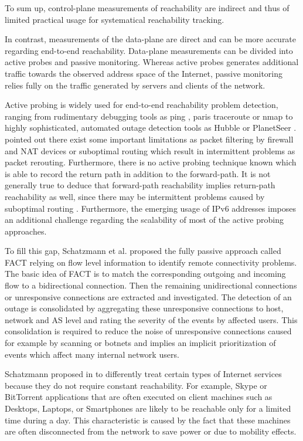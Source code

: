 \documentclass{sigcomm-alternate}
\begin{document}
To sum up, control-plane measurements of reachability are indirect
and thus of limited practical usage for systematical reachability
tracking.

In contrast, measurements of the data-plane are direct and can be
more accurate regarding end-to-end reachability. Data-plane
measurements can be divided into active probes and passive monitoring.
Whereas active probes generates additional traffic towards the
observed address space of the Internet, passive monitoring relies
fully on the traffic generated by servers and clients of the network.

Active probing is widely used for end-to-end reachability problem
detection, ranging from rudimentary debugging tools as ping
\cite{PING}, paris traceroute \cite{traceroute} or nmap \cite{Nmap}
to highly sophisticated, automated outage detection tools as Hubble
\cite{Katz:2008} or PlanetSeer \cite{Zhang:2004}. \cite{Bush:Optometry}
pointed out there exist some important limitations as packet filtering
by firewall and NAT devices or suboptimal routing which result in
intermittent problems as packet rerouting. Furthermore, there is
no active probing technique known which is able to record the return
path in addition to the forward-path. It is not generally true to
deduce that forward-path reachability implies return-path reachability
as well, since there may be intermittent problems caused by suboptimal
routing \cite{Bush:Optometry}. Furthermore, the emerging usage of IPv6
addresses imposes an additional challenge regarding the scalability of
most of the active probing approaches.

To fill this gap, Schatzmann et al. proposed the fully
passive approach called FACT\cite{SchatzmannPAM2011} relying on flow level information to
identify remote connectivity problems. The basic idea of FACT is to
match the corresponding outgoing and incoming flow to a bidirectional
connection. Then the remaining unidirectional connections or unresponsive
connections are extracted and investigated. The detection of an outage
is consolidated by aggregating these unresponsive connections to host,
network and AS level and rating the severity of the events by affected
users. This consolidation is required to reduce the noise of unresponsive
connections caused for example by scanning or botnets and implies an
implicit prioritization of events which affect many internal network
users.

Schatzmann proposed in \cite{SchatzmanThesis2012} to differently
treat certain types of Internet services because they do not require
constant reachability. For example, Skype or BitTorrent applications that
are often executed on client machines such as Desktops, Laptops, or
Smartphones are likely to be reachable only for a limited time during a day.
This characteristic is caused by the fact that these machines are often
disconnected from the network to save power or due to mobility effects.
\end{document}
